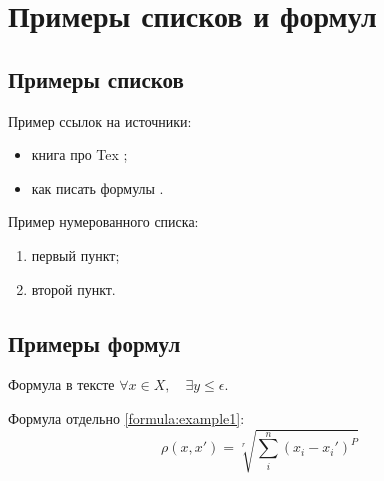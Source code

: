 \section{Примеры списков и формул}
\subsection{Примеры списков}

Пример ссылок на источники:
\begin{itemize}
	\item книга про Tex \autocite{book};
	\item как писать формулы \autocite{latexformuls}.
\end{itemize}

Пример нумерованного списка:
\begin{enumerate}
	\item первый пункт;
	\item второй пункт.
\end{enumerate}

\subsection{Примеры формул}

Формула в тексте $\forall x \in X, \quad \exists y \leq \epsilon$.

Формула отдельно \ref{formula:example1}:
\begin{equation}	
	\rho(x,x')=\sqrt[r]{\sum_{i}^{n}(x_i-x_i')^P}
	\label{formula:example1}
\end{equation}